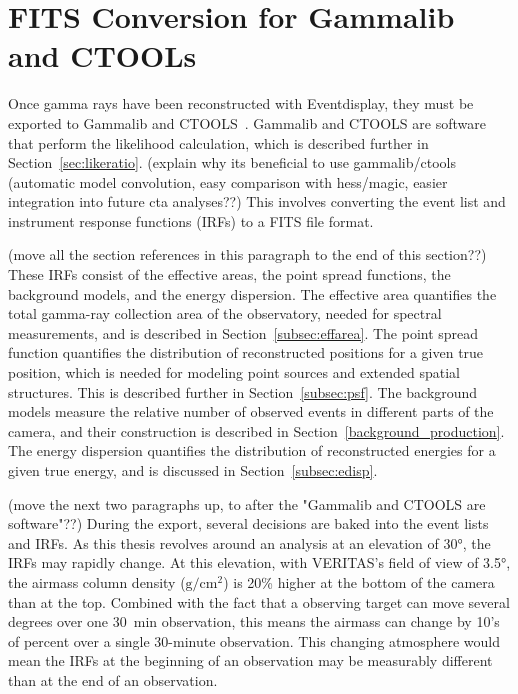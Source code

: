 \section{FITS Conversion for Gammalib and CTOOLs}\label{fitsconversion}
  Once gamma rays have been reconstructed with Eventdisplay, they must be exported to Gammalib and CTOOLS~\cite{gammalibctools}.
  Gammalib and CTOOLS are software that perform the likelihood calculation, which is described further in Section~\ref{sec:likeratio}.
  {\color{red}(explain why its beneficial to use gammalib/ctools (automatic model convolution, easy comparison with hess/magic, easier integration into future cta analyses??)}
  This involves converting the event list and instrument response functions (IRFs) to a FITS file format.
  
  {\color{red}(move all the section references in this paragraph to the end of this section??)}
  These IRFs consist of the effective areas, the point spread functions, the background models, and the energy dispersion.
  The effective area quantifies the total gamma-ray collection area of the observatory, needed for spectral measurements, and is described in Section~\ref{subsec:effarea}.
  The point spread function quantifies the distribution of reconstructed positions for a given true position, which is needed for modeling point sources and extended spatial structures.
  This is described further in Section~\ref{subsec:psf}.
  The background models measure the relative number of observed events in different parts of the camera, and their construction is described in Section~\ref{background_production}.
  The energy dispersion quantifies the distribution of reconstructed energies for a given true energy, and is discussed in Section~\ref{subsec:edisp}.
  
  {\color{red}(move the next two paragraphs up, to after the "Gammalib and CTOOLS are software"??)}
  During the export, several decisions are baked into the event lists and IRFs.
  As this thesis revolves around an analysis at an elevation of \nicetilde{}\ang{30}, the IRFs may rapidly change.
  At this elevation, with VERITAS's field of view of \ang{3.5}, the airmass column density ($\textrm{g}/\textrm{cm}^2$) is 20\% higher at the bottom of the camera than at the top.
  Combined with the fact that a observing target can move several degrees over one \SI{30}{min} observation, this means the airmass can change by 10's of percent over a single 30-minute observation.
  This changing atmosphere would mean the IRFs at the beginning of an observation may be measurably different than at the end of an observation.


